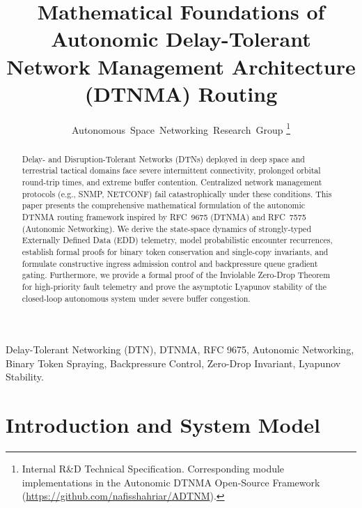 \documentclass[journal,compsoc]{IEEEtran}
\begin{document}
\title{Mathematical Foundations of Autonomic Delay-Tolerant Network Management Architecture (DTNMA) Routing}

\author{Autonomous~Space~Networking~Research~Group%
\thanks{Internal R\&D Technical Specification. Corresponding module implementations in the Autonomic DTNMA Open-Source Framework (\url{https://github.com/nafisshahriar/ADTNM}).}}


\maketitle

\begin{abstract}
Delay- and Disruption-Tolerant Networks (DTNs) deployed in deep space and terrestrial tactical domains face severe intermittent connectivity, prolonged orbital round-trip times, and extreme buffer contention. Centralized network management protocols (e.g., SNMP, NETCONF) fail catastrophically under these conditions. This paper presents the comprehensive mathematical formulation of the autonomic DTNMA routing framework inspired by RFC~9675 (DTNMA) and RFC~7575 (Autonomic Networking). We derive the state-space dynamics of strongly-typed Externally Defined Data (EDD) telemetry, model probabilistic encounter recurrences, establish formal proofs for binary token conservation and single-copy invariants, and formulate constructive ingress admission control and backpressure queue gradient gating. Furthermore, we provide a formal proof of the Inviolable Zero-Drop Theorem for high-priority fault telemetry and prove the asymptotic Lyapunov stability of the closed-loop autonomous system under severe buffer congestion.
\end{abstract}

\begin{IEEEkeywords}
Delay-Tolerant Networking (DTN), DTNMA, RFC 9675, Autonomic Networking, Binary Token Spraying, Backpressure Control, Zero-Drop Invariant, Lyapunov Stability.
\end{IEEEkeywords}

\section{Introduction and System Model}
\end{document}
